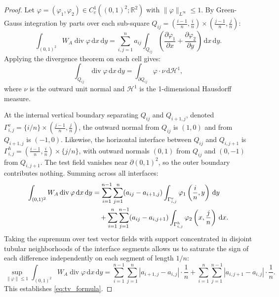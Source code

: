 \documentclass[11pt,a4paper,reqno]{amsart}
\theoremstyle{definition}
\numberwithin{equation}{section}
\providecommand{\R}{\mathbb{R}}
\newcommand{\dif}{\,\mathrm{d}}
\begin{document}
\begin{proof}
Let $\varphi = (\varphi_1, \varphi_2) \in C_c^1((0,1)^2; \R^2)$ with $\|\varphi\|_{L^\infty} \le 1$. By Green-Gauss integration by parts over each sub-square $Q_{ij} = (\frac{i-1}{n}, \frac{i}{n}) \times (\frac{j-1}{n}, \frac{j}{n})$:
\begin{equation}
    \int_{(0,1)^2} W_A \operatorname{div} \varphi \dif x \dif y = \sum_{i,j=1}^n a_{ij} \int_{Q_{ij}} \left( \frac{\partial \varphi_1}{\partial x} + \frac{\partial \varphi_2}{\partial y} \right) \dif x \dif y.
\end{equation}
Applying the divergence theorem on each cell gives:
\begin{equation}
    \int_{Q_{ij}} \operatorname{div}\varphi \dif x \dif y = \int_{\partial Q_{ij}} \varphi \cdot \nu \dif \mathcal{H}^1,
\end{equation}
where $\nu$ is the outward unit normal and $\mathcal{H}^1$ is the 1-dimensional Hausdorff measure. 

At the internal vertical boundary separating $Q_{ij}$ and $Q_{i+1, j}$, denoted $\Gamma_{i, j}^v = \{i/n\} \times (\frac{j-1}{n}, \frac{j}{n})$, the outward normal from $Q_{ij}$ is $(1, 0)$ and from $Q_{i+1, j}$ is $(-1, 0)$. Likewise, the horizontal interface between $Q_{ij}$ and $Q_{i,j+1}$ is $\Gamma_{i, j}^h = (\frac{i-1}{n}, \frac{i}{n}) \times \{j/n\}$, with outward normals $(0,1)$ from $Q_{ij}$ and $(0,-1)$ from $Q_{i,j+1}$. The test field vanishes near $\partial(0,1)^2$, so the outer boundary contributes nothing. Summing across all interfaces:
\begin{align}
    \int_{(0,1)^2} W_A \operatorname{div} \varphi \dif x \dif y 
    &= \sum_{i=1}^{n-1} \sum_{j=1}^n (a_{ij} - a_{i+1, j}) \int_{\Gamma_{i,j}^v} \varphi_1\left(\frac{i}{n}, y\right) \dif y \notag \\
    &\quad + \sum_{i=1}^n \sum_{j=1}^{n-1} (a_{ij} - a_{i, j+1}) \int_{\Gamma_{i,j}^h} \varphi_2\left(x, \frac{j}{n}\right) \dif x.
\end{align}
Taking the supremum over test vector fields with support concentrated in disjoint tubular neighborhoods of the interface segments allows us to saturate the sign of each difference independently on each segment of length $1/n$:
\begin{equation}
    \sup_{\|\varphi\|\le 1} \int_{(0,1)^2} W_A \operatorname{div} \varphi \dif x \dif y = \sum_{i=1}^{n-1} \sum_{j=1}^n |a_{i+1, j} - a_{i,j}| \cdot \frac{1}{n} + \sum_{i=1}^n \sum_{j=1}^{n-1} |a_{i, j+1} - a_{i, j}| \cdot \frac{1}{n}.
\end{equation}
This establishes \eqref{eq:tv_formula}.
\end{proof}
\end{document}
